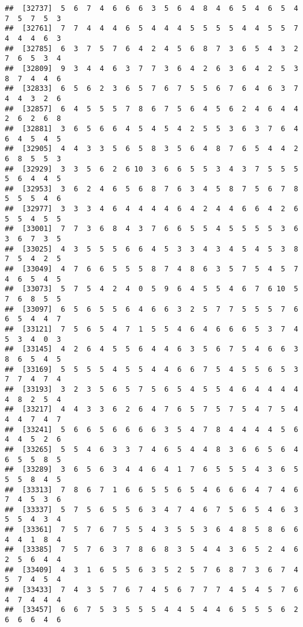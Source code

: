 \documentclass[
]{book}
\begin{document}
\begin{verbatim}
##  [32737]  5  6  7  4  6  6  6  3  5  6  4  8  4  6  5  4  6  5  4  7  5  7  5  3
##  [32761]  7  7  4  4  4  6  5  4  4  4  5  5  5  5  4  4  5  5  7  4  4  4  6  3
##  [32785]  6  3  7  5  7  6  4  2  4  5  6  8  7  3  6  5  4  3  2  7  6  5  3  4
##  [32809]  9  3  4  4  6  3  7  7  3  6  4  2  6  3  6  4  2  5  3  8  7  4  4  6
##  [32833]  6  5  6  2  3  6  5  7  6  7  5  5  6  7  6  4  6  3  7  4  4  3  2  6
##  [32857]  6  4  5  5  5  7  8  6  7  5  6  4  5  6  2  4  6  4  4  2  6  2  6  8
##  [32881]  3  6  5  6  6  4  5  4  5  4  2  5  5  3  6  3  7  6  4  6  4  5  4  5
##  [32905]  4  4  3  3  5  6  5  8  3  5  6  4  8  7  6  5  4  4  2  6  8  5  5  3
##  [32929]  3  3  5  6  2  6 10  3  6  6  5  5  3  4  3  7  5  5  5  5  6  4  4  5
##  [32953]  3  6  2  4  6  5  6  8  7  6  3  4  5  8  7  5  6  7  8  5  5  5  4  6
##  [32977]  3  3  3  4  6  4  4  4  4  6  4  2  4  4  6  6  4  2  6  5  5  4  5  5
##  [33001]  7  7  3  6  8  4  3  7  6  6  5  5  4  5  5  5  5  3  6  3  6  7  3  5
##  [33025]  4  3  5  5  5  6  6  4  5  3  3  4  3  4  5  4  5  3  8  7  5  4  2  5
##  [33049]  4  7  6  6  5  5  5  8  7  4  8  6  3  5  7  5  4  5  7  4  6  5  4  5
##  [33073]  5  7  5  4  2  4  0  5  9  6  4  5  5  4  6  7  6 10  5  7  6  8  5  5
##  [33097]  6  5  6  5  5  6  4  6  6  3  2  5  7  7  5  5  5  7  6  6  5  4  4  7
##  [33121]  7  5  6  5  4  7  1  5  5  4  6  4  6  6  6  5  3  7  4  5  3  4  0  3
##  [33145]  4  2  6  4  5  5  6  4  4  6  3  5  6  7  5  4  6  6  3  8  6  5  4  5
##  [33169]  5  5  5  5  4  5  5  4  4  6  6  7  5  4  5  5  6  5  3  7  7  4  7  4
##  [33193]  3  2  3  5  6  5  7  5  6  5  4  5  5  4  6  4  4  4  4  4  8  2  5  4
##  [33217]  4  4  3  3  6  2  6  4  7  6  5  7  5  7  5  4  7  5  4  4  4  7  4  7
##  [33241]  5  6  6  5  6  6  6  6  3  5  4  7  8  4  4  4  4  5  6  4  4  5  2  6
##  [33265]  5  5  4  6  3  3  7  4  6  5  4  4  8  3  6  6  5  6  4  6  5  5  8  5
##  [33289]  3  6  5  6  3  4  4  6  4  1  7  6  5  5  5  4  3  6  5  5  5  8  4  5
##  [33313]  7  8  6  7  1  6  6  5  5  6  5  4  6  6  6  4  7  4  6  7  4  5  3  6
##  [33337]  5  7  5  6  5  5  6  3  4  7  4  6  7  5  6  5  4  6  3  5  5  4  3  4
##  [33361]  7  5  7  6  7  5  5  4  3  5  5  3  6  4  8  5  8  6  6  4  4  1  8  4
##  [33385]  7  5  7  6  3  7  8  6  8  3  5  4  4  3  6  5  2  4  6  2  5  6  4  4
##  [33409]  4  3  1  6  5  5  6  3  5  2  5  7  6  8  7  3  6  7  4  5  7  4  5  4
##  [33433]  7  4  3  5  7  6  7  4  5  6  7  7  7  4  5  4  5  7  6  4  7  4  4  4
##  [33457]  6  6  7  5  3  5  5  5  4  4  5  4  4  6  5  5  5  6  2  6  6  6  4  6

\end{verbatim}
\end{document}
